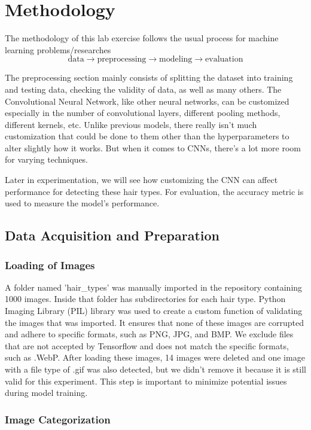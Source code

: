 \section{Methodology}

The methodology of this lab exercise follows the usual process for machine learning problems/researches
\[
  \text{data} \to \text{preprocessing} \to \text{modeling} \to \text{evaluation}
\]

The preprocessing section mainly consists of splitting the dataset into training and testing data, checking the validity of data, as well as many others. The Convolutional Neural Network, like other neural networks, can be customized especially in the number of convolutional layers, different pooling methods, different kernels, etc. Unlike previous models, there really isn't much customization that could be done to them other than the hyperparameters to alter slightly how it works. But when it comes to CNNs, there's a lot more room for varying techniques. 

Later in experimentation, we will see how customizing the CNN can affect performance for detecting these hair types. For evaluation, the accuracy metric is used to measure the model's performance. 

\subsection{Data Acquisition and Preparation}

\subsubsection{Loading of Images}

A folder named 'hair_types' was manually imported in the repository containing 1000 images. Inside that folder has subdirectories for each hair type. Python Imaging Library (PIL) library was used to create a custom function of validating the images that was imported. It ensures that none of these images are corrupted and adhere to specific formats, such as PNG, JPG, and BMP. We exclude files that are not accepted by Tensorflow and does not match the specific formats, such as .WebP. After loading these images, 14 images were deleted and one image with a file type of .gif was also detected, but we didn't remove it because it is still valid for this experiment. This step is important to minimize potential issues during model training.

\subsubsection{Image Categorization}

